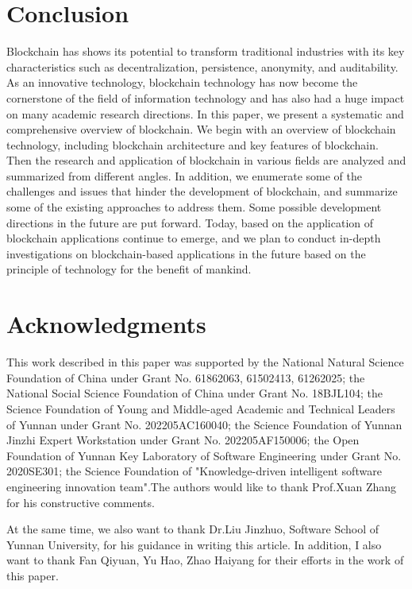 \documentclass[lettersize,journal]{IEEEtran}
\begin{document}
\section{Conclusion}
Blockchain has shows its potential to transform traditional industries with its key characteristics such as decentralization, persistence, anonymity, and auditability. As an innovative technology, blockchain technology has now become the cornerstone of the field of information technology and has also had a huge impact on many academic research directions. In this paper, we present a systematic and comprehensive overview of blockchain. We begin with an overview of blockchain technology, including blockchain architecture and key features of blockchain. Then the research and application of blockchain in various fields are analyzed and summarized from different angles. In addition, we enumerate some of the challenges and issues that hinder the development of blockchain, and summarize some of the existing approaches to address them. Some possible development directions in the future are put forward. Today, based on the application of blockchain applications continue to emerge, and we plan to conduct in-depth investigations on blockchain-based applications in the future based on the principle of technology for the benefit of mankind.


\section*{Acknowledgments}
This work described in this paper was supported by the National Natural Science Foundation of China under Grant No. 61862063, 61502413, 61262025; the National Social Science Foundation of China under Grant No. 18BJL104; the Science Foundation of Young and Middle-aged Academic and Technical Leaders of Yunnan under Grant No. 202205AC160040; the Science Foundation of Yunnan Jinzhi Expert Workstation under Grant No. 202205AF150006; the Open Foundation of Yunnan Key Laboratory of Software Engineering under Grant No. 2020SE301; the Science Foundation of "Knowledge-driven intelligent software engineering innovation team".The authors would like to thank Prof.Xuan Zhang for his constructive comments.

At the same time, we also want to thank Dr.Liu Jinzhuo, Software School of Yunnan University, for his guidance in writing this article. In addition, I also want to thank Fan Qiyuan, Yu Hao, Zhao Haiyang for their efforts in the work of this paper.
\end{document}
